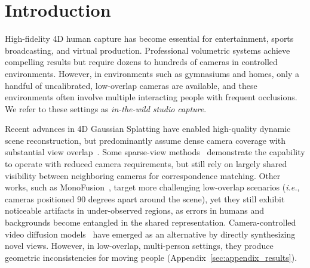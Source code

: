 \documentclass[acmtog]{acmart}
\newcommand{\ie}{\textit{i.e.}}
\begin{document}
\maketitle

\section{Introduction}

High-fidelity 4D human capture has become essential for entertainment, sports broadcasting, and virtual production.
Professional volumetric systems achieve compelling results but require dozens to hundreds of cameras in controlled environments.
However, in environments such as gymnasiums and homes, only a handful of uncalibrated, low-overlap cameras are available, and these environments often involve multiple interacting people with frequent occlusions.
We refer to these settings as \emph{in-the-wild studio capture}.

Recent advances in 4D Gaussian Splatting have enabled high-quality dynamic scene reconstruction, but predominantly assume dense camera coverage with substantial view overlap~\cite{wu20244d, li2024spacetime, wang2025freetimegs}.
Some sparse-view methods~\cite{li2024dngaussian, park2025dropgaussian, liu2024deceptive, kong2025generative} demonstrate the capability to operate with reduced camera requirements, but still rely on largely shared visibility between neighboring cameras for correspondence matching.
Other works, such as MonoFusion~\cite{wang2025monofusion}, target more challenging low-overlap scenarios (\ie, cameras positioned 90 degrees apart around the scene), yet they still exhibit noticeable artifacts in under-observed regions, as errors in humans and backgrounds become entangled in the shared representation.
Camera-controlled video diffusion models~\cite{bai2025recammaster, ren2025gen3c, jin2025diffuman4d, wu2025cat4d} have emerged as an alternative by directly synthesizing novel views. However, in low-overlap, multi-person settings, they produce geometric inconsistencies for moving people (Appendix~\ref{sec:appendix_results}).
\end{document}
